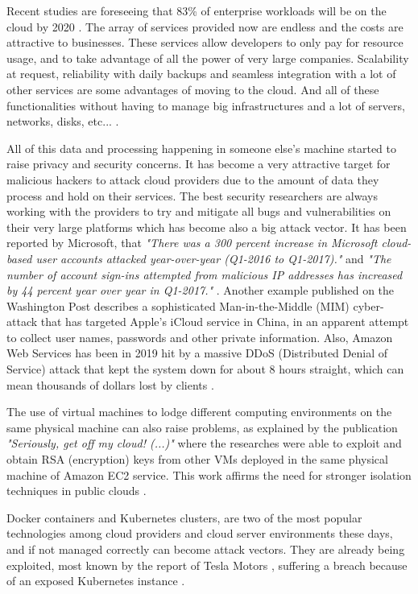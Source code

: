 Recent studies are foreseeing that 83{\%} of enterprise workloads will be on the cloud by 2020 \cite{cloud_statistic:1}. The array of services provided now are endless and the costs are attractive to businesses. These services allow developers to only pay for resource usage, and to take advantage of all the power of very large companies. Scalability at request, reliability with daily backups and seamless integration with a lot of other services are some advantages of moving to the cloud. And all of these functionalities without having to manage big infrastructures and a lot of servers, networks, disks, etc... \cite{cloud_benefits:1}.

All of this data and processing happening in someone else's machine started to raise privacy and security concerns. It has become a very attractive target for malicious hackers to attack cloud providers due to the amount of data they process and hold on their services. The best security researchers are always working with the providers to try and mitigate all bugs and vulnerabilities on their very large platforms which has become also a big attack vector. It has been reported by Microsoft, that \textit{"There was a 300 percent increase in Microsoft cloud-based user accounts attacked year-over-year (Q1-2016 to Q1-2017)."} and \textit{"The number of account sign-ins attempted from malicious IP addresses has increased by 44 percent year over year in Q1-2017."} \cite{cloud_attacks:1}. Another example published on the Washington Post describes a sophisticated Man-in-the-Middle (\gls{MIM}) cyber-attack that has targeted Apple’s iCloud service in China, in an apparent attempt to collect user names, passwords and other private information. Also, Amazon Web Services has been in 2019 hit by a massive \gls{DDoS} (Distributed Denial of Service) attack that kept the system down for about 8 hours straight, which can mean thousands of dollars lost by clients \cite{cloud_attacks:3}.

The use of virtual machines to lodge different computing environments on the same physical machine can also raise problems, as explained by the publication \textit{"Seriously, get off my cloud! (...)"} where the researches were able to exploit and obtain \gls{RSA} (encryption) keys from other \glspl{VM} deployed in the same physical machine of Amazon EC2 service. This work affirms the need for stronger isolation techniques in public clouds \cite{cryptoeprint:2015:898}.

Docker containers and Kubernetes clusters, are two of the most popular technologies among cloud providers and cloud server environments these days, and if not managed correctly can become attack vectors. They are already being exploited, most known by the report of Tesla Motors \cite{tesla_leak:1}, suffering a breach because of an exposed Kubernetes instance \cite{docker_leak:1, kubernetes_leak:1}.

